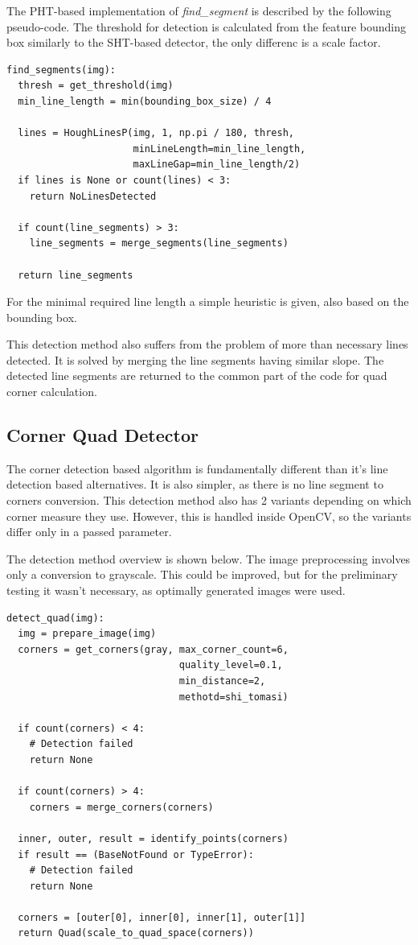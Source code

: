 The PHT-based implementation of \textit{find\_segment} is described by the following pseudo-code.
The threshold for detection is calculated from the feature bounding box similarly to the SHT-based detector, the only differenc is a scale factor.
\begin{lstlisting}
find_segments(img):
  thresh = get_threshold(img)
  min_line_length = min(bounding_box_size) / 4

  lines = HoughLinesP(img, 1, np.pi / 180, thresh, 
                      minLineLength=min_line_length, 
                      maxLineGap=min_line_length/2)
  if lines is None or count(lines) < 3:
    return NoLinesDetected

  if count(line_segments) > 3:
    line_segments = merge_segments(line_segments)
				
  return line_segments
\end{lstlisting}
For the minimal required line length a simple heuristic is given, also based on the bounding box.

This detection method also suffers from the problem of more than necessary lines detected.
It is solved by merging the line segments having similar slope.
The detected line segments are returned to the common part of the code for quad corner calculation.

\subsection{Corner Quad Detector}

The corner detection based algorithm is fundamentally different than it's line detection based alternatives.
It is also simpler, as there is no line segment to corners conversion.
This detection method also has 2 variants depending on which corner measure they use.
However, this is handled inside OpenCV, so the variants differ only in a passed parameter.

The detection method overview is shown below.
The image preprocessing involves only a conversion to grayscale.
This could be improved, but for the preliminary testing it wasn't necessary, as optimally generated images were used.
\begin{lstlisting}
detect_quad(img):
  img = prepare_image(img)
  corners = get_corners(gray, max_corner_count=6, 
                              quality_level=0.1, 
                              min_distance=2, 
                              methotd=shi_tomasi)
	
  if count(corners) < 4:
    # Detection failed
    return None
	
  if count(corners) > 4:
    corners = merge_corners(corners)
	 
  inner, outer, result = identify_points(corners)
  if result == (BaseNotFound or TypeError):
    # Detection failed
    return None
	
  corners = [outer[0], inner[0], inner[1], outer[1]]	
  return Quad(scale_to_quad_space(corners))
\end{lstlisting}

